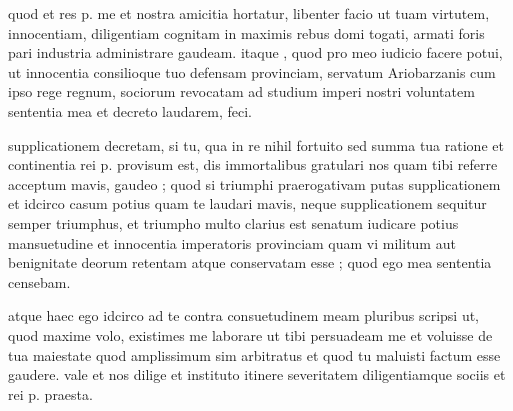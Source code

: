 


 quod et res p. me et nostra amicitia hortatur, libenter facio ut tuam virtutem, innocentiam, diligentiam cognitam in maximis rebus domi togati, armati foris pari industria administrare gaudeam. itaque , quod pro meo iudicio facere potui, ut innocentia consilioque tuo defensam provinciam, servatum Ariobarzanis cum ipso rege regnum, sociorum revocatam ad studium imperi nostri voluntatem sententia mea et decreto laudarem, feci.

 supplicationem decretam, si tu, qua in re nihil fortuito sed summa tua ratione et continentia rei p. provisum est, dis immortalibus gratulari nos quam tibi referre acceptum mavis, gaudeo ; quod si triumphi praerogativam putas supplicationem et idcirco casum potius quam te laudari mavis, neque supplicationem sequitur semper triumphus, et triumpho multo clarius est senatum iudicare potius mansuetudine et innocentia imperatoris provinciam quam vi militum aut benignitate deorum retentam atque conservatam esse ; quod ego mea sententia censebam.

 atque haec ego idcirco ad te contra consuetudinem meam pluribus scripsi ut, quod maxime volo, existimes me laborare ut tibi persuadeam me et voluisse de tua maiestate quod amplissimum sim arbitratus et quod tu maluisti factum esse gaudere. vale et nos dilige et instituto itinere severitatem diligentiamque sociis et rei p. praesta.
